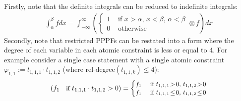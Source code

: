\documentclass[letterpaper]{article}
\newcommand{\case}[2]{#2 &\text{ if } #1}%
\newcommand{\otherwise}[1]{#1 &\text{ otherwise}}
\begin{document}
Firstly, note that the definite integrals can be reduced to indefinite integrals:
{
\footnotesize
\begin{align*}
\int_{\alpha}^{\beta} f dx  = 
\int_{-\infty}^{\infty}
\left (
  \begin{cases}
  \case{x\!>\!\alpha,\, x\!<\!\beta,\, \alpha \!<\! \beta}{1}\\
 \otherwise{0}    
  \end{cases}
\otimes
  f
\right)
dx
\end{align*}
}
Secondly, note that restricted PPPFs can be restated into a form where
the degree of each variable in each atomic constraint is less or equal to 4.
For example consider a single case statement with a single atomic constraint 
$\varphi_{1,1} := t_{1,1,1} \cdot t_{1,1,2}$ (where rel-degree$(t_{1,1,k})\leq4$):
\begin{align*}
{\footnotesize
\left(
f_1 \quad \text{if } t_{1,1,1} \cdot t_{1,1,2} > 0
\right)
 =
\begin{cases}
  \case{t_{1,1,1} \!>\! 0, \, t_{1,1,2} \!>\! 0 }{f_1} \\ 
  \case{t_{1,1,1} \!\leq\! 0, \, t_{1,1,2} \!\leq\! 0 }{f_1} 
 \end{cases} 
}
\end{align*}
\end{document}
